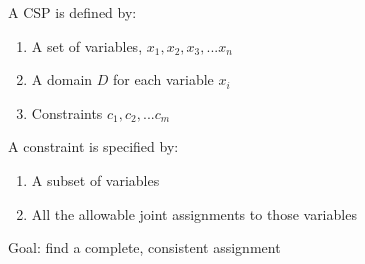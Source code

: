 \documentclass[letterpaper]{article} %
\begin{document}
A CSP is defined by:

\begin{enumerate}
	\item A set of variables, $x_1,x_2,x_3,...x_n$
	\item A domain $D$ for each variable $x_i$
	\item Constraints $c_1,c_2,...c_m$
\end{enumerate}

A constraint is specified by:

\begin{enumerate}
	\item A subset of variables
	\item All the allowable joint assignments to those variables
\end{enumerate}

Goal: find a complete, consistent assignment
\end{document}
